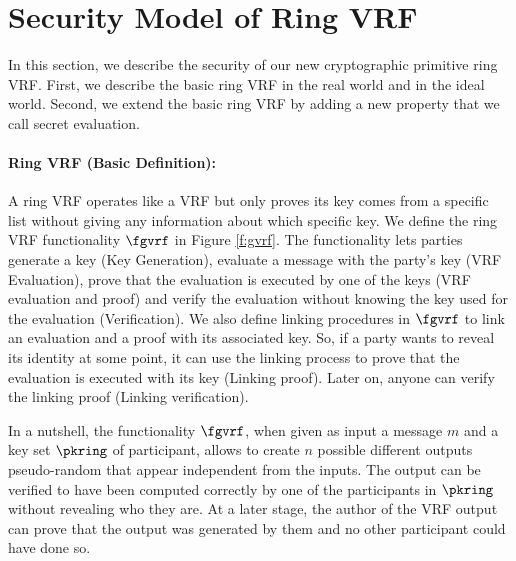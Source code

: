 \section{Security Model of Ring VRF}


In this section, we describe the security of our new cryptographic primitive ring VRF. First, we describe the basic ring VRF in the real world and in the ideal world. Second, we extend the basic ring VRF by adding a new property that we call secret evaluation. 


\paragraph{Ring VRF (Basic Definition):} A ring VRF operates like a VRF but only proves its key comes from a specific list without giving any information about which specific key. We define the ring VRF functionality $ \fgvrf $ in Figure \ref{f:gvrf}. The functionality lets parties generate a key (Key Generation), evaluate a message with the party's key (VRF Evaluation), prove that the evaluation is executed by one of the keys (VRF evaluation and proof) and verify the evaluation without knowing the key used for the evaluation (Verification). We also define linking procedures in $ \fgvrf $ to link an evaluation and a proof with its associated key. So, if a party wants to reveal its identity at some point, it can use the linking process to prove that the evaluation is executed with its key (Linking proof). Later on, anyone can verify the linking proof (Linking verification).

In a nutshell, the functionality $\fgvrf$, when given as input a message $m$ and a key set $\pkring$ of participant, allows to create $n$ possible different outputs pseudo-random that appear independent from the inputs. The output can be verified to have been computed correctly by one of the participants in $\pkring$ without revealing who they are. At a later stage, the author of the VRF output can prove that the output was generated by them and no other participant could have done so.

